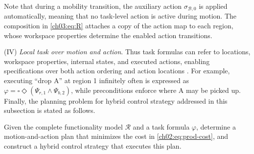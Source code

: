 Note that during a mobility transition, the auxiliary action $\sigma_{\mathcal{B},0}$ is
applied automatically, meaning that no task-level action is active during
motion. The composition in \eqref{ch03:eq:R} attaches a copy of the action map
to each region, whose workspace properties determine the enabled action
transitions.

(IV) \emph{Local task over motion and action}.
 Thus task
formulas can refer to locations, workspace properties, internal states, and
executed actions, enabling specifications over both action ordering and action
locations \citep{bhatia2010sampling,kloetzer2010automatic,smith2011optimal}. For
example, executing ``drop \textsf{A}'' at region \textsf{1} infinitely often is
expressed as $\varphi = \square \Diamond (\Psi_{r,1} \wedge \Psi_{b,2})$, while
preconditions enforce where \textsf{A} may be picked up.
Finally, the planning problem for hybrid control strategy
addressed in this subsection is stated as follows.

\begin{problem}
\label{ch03:pro:full}
Given the complete functionality model $\mathcal{R}$ and a task formula
$\varphi$, determine a motion-and-action plan that minimizes the cost in
\eqref{ch02:eq:prod-cost}, and construct a hybrid control strategy that
executes this plan.
\end{problem}


